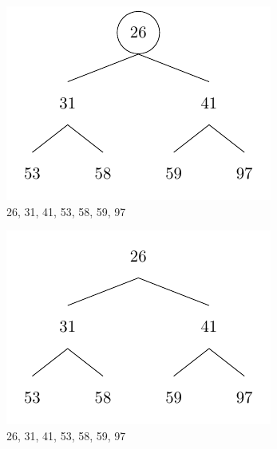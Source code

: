 \begin{center}
\begin{minipage}{0.32\textwidth}
  \begin{figure}[H]
    \centering
    \includegraphics[width=\textwidth]{Figure/HeapSort7.pdf}
    \caption*{26, 31, 41, 53, 58, 59, 97}
  \end{figure}
\end{minipage}
\begin{minipage}{0.32\textwidth}
  \begin{figure}[H]
    \centering
    \includegraphics[width=\textwidth]{Figure/HeapSort8.pdf}
    \caption*{26, 31, 41, 53, 58, 59, 97}
  \end{figure}
\end{minipage}
\end{center}

